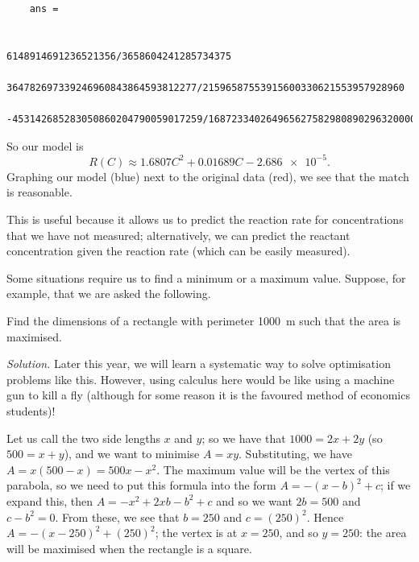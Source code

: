 \begin{ex}
\begin{verbatim}
    ans =

                                      6148914691236521356/3658604241285734375
        364782697339246960843864593812277/21596587553915600330621553957928960
    -453142685283050860204790059017259/16872334026496562758298089029632000000
  \end{verbatim}
  So our model is
  \begin{displaymath}
    R(C) \approx 1.6807 C^2 + 0.01689 C - \num{2.686e-5}.
  \end{displaymath}
  Graphing our model (blue) next to the original data (red), we see that the match is reasonable.
  \begin{center}
  \end{center}
  This is useful because it allows us to predict the reaction rate for concentrations that we have not measured; alternatively, we can predict the
  reactant concentration given the reaction rate (which can be easily measured).
\end{ex}

Some situations require us to find a minimum or a maximum value. Suppose, for example, that we are asked the following.

\begin{ex}
  Find the dimensions of a rectangle with perimeter \SI{1000}{\metre} such that the area is maximised.

  \textit{Solution.} Later this year, we will learn a systematic way to solve optimisation problems like this. However, using calculus here would be
  like using a machine gun to kill a fly (although for some reason it is the favoured method of economics students)!

  Let us call the two side lengths $ x $ and $ y $; so we have that $ 1000 = 2x + 2y $ (so $ 500 = x + y $), and we want to minimise $ A = xy $. Substituting,
  we have $ A = x(500 - x) = 500x - x^2 $. The maximum value will be the vertex of this parabola, so we need to put this formula into
  the form $ A = -(x - b)^2 + c $; if we expand this, then $ A = -x^2 + 2xb - b^2 + c $ and so we want $ 2b = 500 $ and $ c - b^2 = 0 $.
  From these, we see that $ b = 250 $ and $ c = (250)^2 $. Hence $ A = -(x - 250)^2 + (250)^2 $; the vertex is at $ x = 250 $, and so $ y = 250 $: the area
  will be maximised when the rectangle is a square.
\end{ex}


